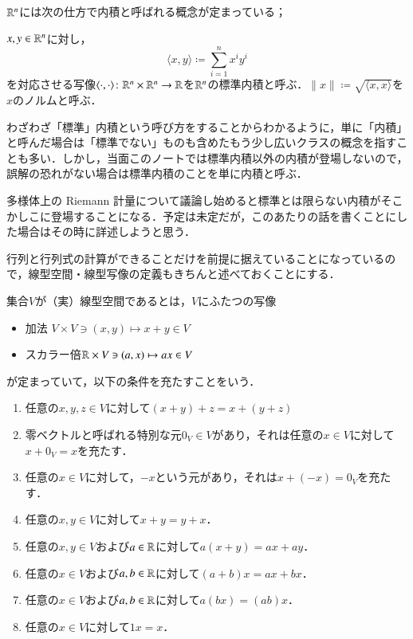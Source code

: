$\mathbb{R}^n$には次の仕方で内積と呼ばれる概念が定まっている；

\begin{defi}
$x, y \in \mathbb{R}^n$に対し，
\begin{equation}
\langle x,y \rangle \coloneqq \sum_{i=1}^n x^i y^i
\end{equation}を対応させる写像$\langle \cdot , \cdot \rangle \colon \mathbb{R}^n \times \mathbb{R}^n \to \mathbb{R}$を$\mathbb{R}^n$の標準内積と呼ぶ．$\|x\| \coloneqq \sqrt{\langle x, x \rangle}$を$x$のノルムと呼ぶ．
\end{defi}

\begin{dig}
わざわざ「標準」内積という呼び方をすることからわかるように，単に「内積」と呼んだ場合は「標準でない」ものも含めたもう少し広いクラスの概念を指すことも多い．しかし，当面このノートでは標準内積以外の内積が登場しないので，誤解の恐れがない場合は標準内積のことを単に内積と呼ぶ．

多様体上の Riemann 計量について議論し始めると標準とは限らない内積がそこかしこに登場することになる．予定は未定だが，このあたりの話を書くことにした場合はその時に詳述しようと思う．
\end{dig}

行列と行列式の計算ができることだけを前提に据えていることになっているので，線型空間・線型写像の定義もきちんと述べておくことにする．

\begin{defi}
集合$V$が（実）線型空間であるとは，$V$にふたつの写像

\begin{itemize}
\item 加法 $V \times V \ni (x,y)  \mapsto x+y \in V$
\item スカラー倍$\mathbb{R} \times V \ni (a,x) \mapsto ax \in V$
\end{itemize}
が定まっていて，以下の条件を充たすことをいう．

\begin{enumerate}
\item 任意の$x,y,z \in V$に対して$(x+y)+z = x+(y+z)$
\item 零ベクトルと呼ばれる特別な元$0_V \in V$があり，それは任意の$x \in V$に対して$x+0_V = x$を充たす．
\item 任意の$x \in V$に対して，$-x$という元があり，それは$x+(-x)=0_V$を充たす．
\item 任意の$x,y \in V$に対して$x+y=y+x$．
\item 任意の$x,y \in V$および$a \in \mathbb{R}$に対して$a(x+y) = ax + ay$．
\item 任意の$x \in V$および$a, b \in \mathbb{R}$に対して$(a+b)x = ax + bx$．
\item 任意の$x \in V$および$a, b \in \mathbb{R}$に対して$a(bx) = (ab)x$．
\item 任意の$x \in V$に対して$1x = x$．
\end{enumerate}
\end{defi}

